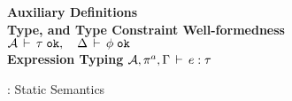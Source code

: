 \begin{figure*}[t!]
%
\textbf{Auxiliary Definitions}\\

%

\vspace*{0.1in}
%
\textbf{Type, and Type Constraint Well-formedness}  \; \fbox
  {\({\mathcal{A}}\,\vdash\,\tau \; \texttt{ok}, \quad 
     \Delta\,\vdash\,\phi \; \texttt{ok}\)}\\


% 

\vspace*{0.1in}
\textbf{Expression Typing}  \; \fbox
  {\({\mathcal{A}},\pi^a,\Gamma\,\vdash\,e:\tau\)}\\

%

\caption{\fbname: Static Semantics}
\label{fig:fb-staticsem}
\end{figure*}


